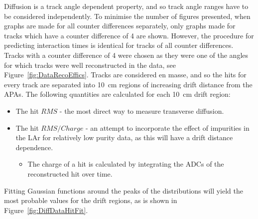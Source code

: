 Diffusion is a track angle dependent property, and so track angle ranges have to be considered independently. To minimise the number of figures presented, when graphs are made for all counter differences separately, only graphs made for tracks which have a counter difference of 4 are shown. However, the procedure for predicting interaction times is identical for tracks of all counter differences. Tracks with a counter difference of 4 were chosen as they were one of the angles for which tracks were well reconstructed in the data, see Figure~\ref{fig:DataRecoEffics}. Tracks are considered en masse, and so the hits for every track are separated into 10~cm regions of increasing drift distance from the APAs. The following quantities are calculated for each 10~cm drift region:
\begin{itemize}
\item The hit $RMS$ - the most direct way to measure transverse diffusion.
\item The hit $RMS/Charge$ - an attempt to incorporate the effect of impurities in the LAr for relatively low purity data, as this will have a drift distance dependence.
  \begin{itemize}
  \item The charge of a hit is calculated by integrating the ADCs of the reconstructed hit over time. 
  \end{itemize}
\end{itemize}
Fitting Gaussian functions around the peaks of the distributions will yield the most probable values for the drift regions, as is shown in Figure~\ref{fig:DiffDataHitFit}. \\

